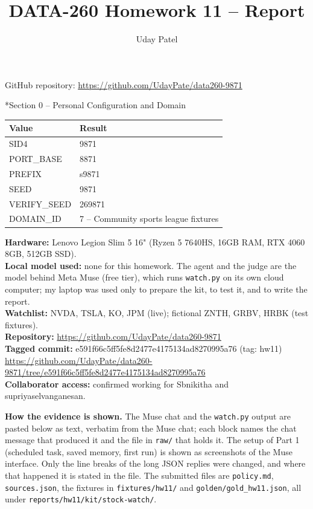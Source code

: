 \documentclass[11pt]{article}
\title{DATA-260 Homework 11 -- Report}
\author{Uday Patel}
\date{}
\makeatletter
\renewcommand\section{\@startsection{section}{1}{\z@}{-3.0ex \@plus -1ex \@minus -.2ex}{1.2ex \@plus.2ex}{\normalfont\fontsize{14}{17}\selectfont\bfseries}}
\makeatother
\begin{document}
\maketitle
\begin{center}GitHub repository: \url{https://github.com/UdayPate/data260-9871}\end{center}

\section*{Section 0 -- Personal Configuration and Domain}
\begin{tabular}{|l|l|}\hline
\textbf{Value} & \textbf{Result} \\\hline
SID4 & 9871 \\\hline
PORT\_BASE & 8871 \\\hline
PREFIX & s9871 \\\hline
SEED & 9871 \\\hline
VERIFY\_SEED & 269871 \\\hline
DOMAIN\_ID & 7 -- Community sports league fixtures \\\hline
\end{tabular}
\vspace{1em}

\textbf{Hardware:} Lenovo Legion Slim 5 16" (Ryzen 5 7640HS, 16GB RAM, RTX 4060 8GB, 512GB SSD). \\
\textbf{Local model used:} none for this homework. The agent and the judge are the model behind Meta Muse (free tier), which runs \texttt{watch.py} on its own cloud computer; my laptop was used only to prepare the kit, to test it, and to write the report. \\
\textbf{Watchlist:} NVDA, TSLA, KO, JPM (live); fictional ZNTH, GRBV, HRBK (test fixtures). \\
\textbf{Repository:} \url{https://github.com/UdayPate/data260-9871} \\
\textbf{Tagged commit:} e591f66c5ff5fe8d2477e4175134ad8270995a76 (tag: hw11) \\
{\footnotesize\url{https://github.com/UdayPate/data260-9871/tree/e591f66c5ff5fe8d2477e4175134ad8270995a76}} \\
\textbf{Collaborator access:} confirmed working for Sbnikitha and supriyaselvanganesan.

\textbf{How the evidence is shown.} The Muse chat and the \texttt{watch.py} output are pasted below as text, verbatim from the Muse chat; each block names the chat message that produced it and the file in \texttt{raw/\allowbreak{}} that holds it. The setup of Part 1 (scheduled task, saved memory, first run) is shown as screenshots of the Muse interface. Only the line breaks of the long JSON replies were changed, and where that happened it is stated in the file. The submitted files are \texttt{policy.md}, \texttt{sources.json}, the fixtures in \texttt{fixtures/\allowbreak{}hw11/\allowbreak{}} and \texttt{golden/\allowbreak{}gold\_\allowbreak{}hw11.json}, all under \texttt{reports/\allowbreak{}hw11/\allowbreak{}kit/\allowbreak{}stock-watch/\allowbreak{}}.
\end{document}
